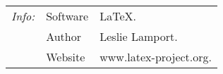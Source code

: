 \documentclass{article}
\begin{document}
\begin{tabular}{@{}>{\itshape}ll!{:}l<{.}@{}}


  \hline
  Info: & Software & \LaTeX\\
        & Author & Leslie Lamport\\
        & Website & www.latex-project.org\\
  \hline
\end{tabular}
\end{document}
